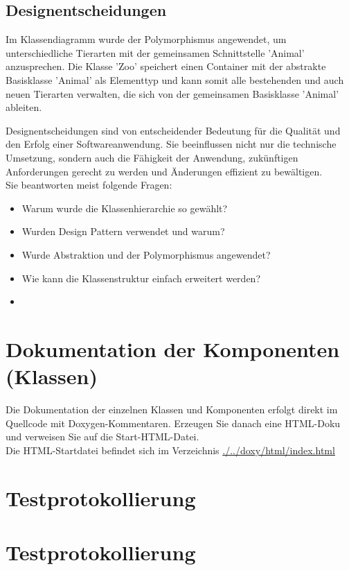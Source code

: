\documentclass[12pt,naustrian,a4widepaper]{scrartcl}
\begin{document}
\subsection{Designentscheidungen}
	Im Klassendiagramm wurde der Polymorphismus angewendet, um unterschiedliche Tierarten mit der gemeinsamen Schnittstelle 'Animal' anzusprechen. Die Klasse 'Zoo' speichert einen Container mit der abstrakte Basisklasse 'Animal' als Elementtyp und kann somit alle bestehenden und auch neuen Tierarten verwalten, die sich von der gemeinsamen Basisklasse 'Animal' ableiten.

\color{blue}
Designentscheidungen sind von entscheidender Bedeutung für die Qualität und den Erfolg einer Softwareanwendung. Sie beeinflussen nicht nur die technische Umsetzung, sondern auch die Fähigkeit der Anwendung, zukünftigen Anforderungen gerecht zu werden und Änderungen effizient zu bewältigen.\\
Sie beantworten meist folgende Fragen:\\
\begin{itemize}
	\item Warum wurde die Klassenhierarchie so gewählt?
	\item Wurden Design Pattern verwendet und warum?
	\item Wurde Abstraktion und der Polymorphismus angewendet?
	\item Wie kann die Klassenstruktur einfach erweitert werden?
	\item 
\end{itemize}

\color{black}

\section{Dokumentation der Komponenten (Klassen)}
\color{blue}
Die Dokumentation der einzelnen Klassen und Komponenten erfolgt direkt im Quellcode mit Doxygen-Kommentaren. Erzeugen Sie danach 
eine HTML-Doku und verweisen Sie auf die Start-HTML-Datei.\\

\color{black}
Die HTML-Startdatei befindet sich im Verzeichnis \href{run:./../doxy/html/index.html}{./../doxy/html/index.html}

\clearpage
\section{Testprotokollierung}
\section{Testprotokollierung}

\end{document}
